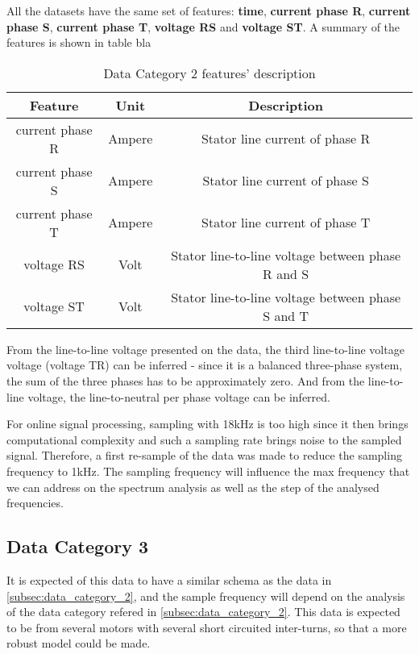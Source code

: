 All the datasets have the same set of features:  \textbf{time}, \textbf{current phase R}, \textbf{current phase S}, \textbf{current phase T}, \textbf{voltage RS} and \textbf{voltage ST}. A summary of the features is shown in table bla

\begin{table}[htpb]
\centering
\caption{Data Category 2 features' description}
\label{my-label}
\begin{tabular}{@{}ccc@{}}
\toprule
\textbf{Feature} & \textbf{Unit} &                                                   \textbf{Description} \\ \midrule
current phase R  & Ampere        & Stator line current of phase R                    \\
current phase S  & Ampere        & Stator line current of phase S                    \\
current phase T  & Ampere        & Stator line current of phase T                    \\
voltage RS       & Volt          & Stator line-to-line voltage between phase R and S \\
voltage ST       & Volt          & Stator line-to-line voltage between phase S and T \\ \bottomrule
\end{tabular}
\end{table}


From the line-to-line voltage presented on the data, the third line-to-line voltage voltage (voltage TR) can be inferred - since it is a balanced three-phase system, the sum of the three phases has to be approximately zero. And from the line-to-line voltage, the line-to-neutral per phase voltage can be inferred.

For online signal processing, sampling with 18kHz is too high since it then brings computational complexity and such a sampling rate brings noise to the sampled signal. Therefore, a first re-sample of the data was made to reduce the sampling frequency to 1kHz. The sampling frequency will influence the max frequency that we can address on the spectrum analysis as well as the step of the analysed frequencies.

\subsection{Data Category 3}
\label{subsec:data_category_3}

It is expected of this data to have a similar schema as the data in \ref{subsec:data_category_2}, and the sample frequency will depend on the analysis of the data category refered in \ref{subsec:data_category_2}. This data is expected to be from several motors with several short circuited inter-turns, so that a more robust model could be made.